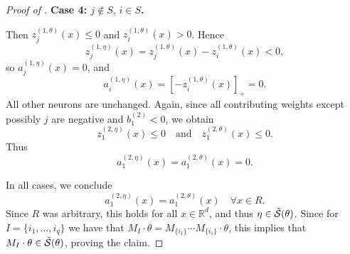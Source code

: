 \documentclass{article}
\theoremstyle{definition}
\newcommand{\R}{\mathbb{R}}
\newcommand{\bias}[1]{b^{(#1)}}
\newcommand{\activation}[1]{a^{(#1)}}
\newcommand{\preactivation}[1]{z^{(#1)}}
\newcommand{\gfiber}[1]{\Tilde{\mathcal{S}}({#1})}
\begin{document}
\begin{proof}[Proof of ]
\medskip
\noindent \textbf{Case 4: $j \notin S,\, i \in S$.}  

Then $\preactivation{1,\theta}_j(x) \le 0$ and $\preactivation{1,\theta}_i(x) > 0$. Hence
\[
\preactivation{1,\eta}_j(x)
=
\preactivation{1,\theta}_j(x) - \preactivation{1,\theta}_i(x)
< 0,
\]
so $\activation{1,\eta}_j(x)=0$, and
\[
\activation{1,\eta}_i(x) = \left[-\preactivation{1,\theta}_i(x)\right]_+ = 0.
\]
All other neurons are unchanged. 
%
Again, since all contributing weights except possibly $j$ are negative and $\bias{2}_1 < 0$, we obtain
\[
\preactivation{2,\eta}_1(x) \le 0
\quad \text{and} \quad
\preactivation{2,\theta}_1(x) \le 0.
\]
Thus
\[
\activation{2,\eta}_1(x) = \activation{2,\theta}_1(x) = 0.
\]

\medskip
\noindent
In all cases, we conclude
\[
\activation{2,\eta}_1(x) = \activation{2,\theta}_1(x) \quad \forall x \in R.
\]
Since $R$ was arbitrary, this holds for all $x \in \R^d$, and thus $\eta \in \gfiber{\theta}$. Since for $I=\{i_1,\ldots,i_q\}$ we have that $M_I \cdot \theta= M_{\{i_1\}} \cdots M_{\{i_1\}}\cdot \theta$, this implies that $M_I\cdot \theta \in \gfiber{\theta}$, proving the claim.
%
\end{proof} 
\end{document}
